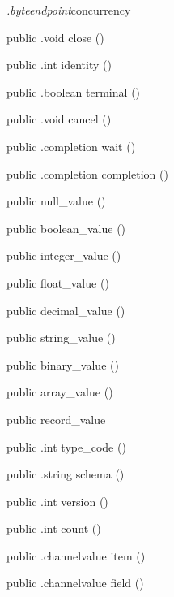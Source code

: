 \begin{CrexxClass}{\textit{.byteendpoint}}{concurrency}
\begin{Members}
    \Method
      {public}
      {.void}
      {close}
      {()}

    \Method
      {public}
      {.int}
      {identity}
      {()}

    \Method
      {public}
      {.boolean}
      {terminal}
      {()}

    \Method
      {public}
      {.void}
      {cancel}
      {()}

    \Method
      {public}
      {.completion}
      {wait}
      {()}

    \Method
      {public}
      {.completion}
      {completion}
      {()}

    \Factory
      {public}
      {null\_value}
      {()}

    \Factory
      {public}
      {boolean\_value}
      {()}

    \Factory
      {public}
      {integer\_value}
      {()}

    \Factory
      {public}
      {float\_value}
      {()}

    \Factory
      {public}
      {decimal\_value}
      {()}

    \Factory
      {public}
      {string\_value}
      {()}

    \Factory
      {public}
      {binary\_value}
      {()}

    \Factory
      {public}
      {array\_value}
      {()}

    \Factory
      {public}
      {record\_value}
      {}

    \Method
      {public}
      {.int}
      {type\_code}
      {()}

    \Method
      {public}
      {.string}
      {schema}
      {()}

    \Method
      {public}
      {.int}
      {version}
      {()}

    \Method
      {public}
      {.int}
      {count}
      {()}

    \Method
      {public}
      {.channelvalue}
      {item}
      {()}

    \Method
      {public}
      {.channelvalue}
      {field}
      {()}


\end{Members}
\end{CrexxClass}
